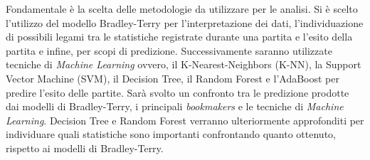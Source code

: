 Fondamentale è la scelta delle metodologie da utilizzare per le analisi. Si è scelto l'utilizzo del modello Bradley-Terry \autocite{bradley1952rank} per l'interpretazione dei dati, l'individuazione di possibili legami tra le statistiche registrate durante una partita e l'esito della partita e infine, per scopi di predizione. Successivamente saranno utilizzate tecniche di \emph{Machine Learning} ovvero, il K-Nearest-Neighbors (K-NN), la Support Vector Machine (SVM), il Decision Tree, il Random Forest e l'AdaBoost per predire l'esito delle partite. Sarà svolto un confronto tra le predizione prodotte dai modelli di Bradley-Terry, i principali \emph{bookmakers} e le tecniche di \emph{Machine Learning}. Decision Tree e Random Forest verranno ulteriormente approfonditi per individuare quali statistiche sono importanti confrontando quanto ottenuto, rispetto ai modelli di Bradley-Terry.
